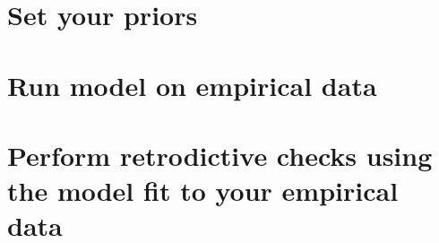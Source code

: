 \documentclass[a4paper,12pt]{article}
\begin{document}
\section{Set your priors}

\section{Run model on empirical data}

\section{Perform retrodictive checks using the model fit to your empirical data}
\end{document}
